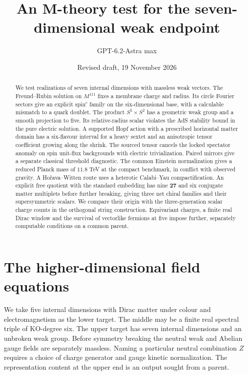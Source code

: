 \documentclass[aps,prd,reprint,onecolumn,nofootinbib,amsmath,amssymb]{revtex4-2}
\begin{document}
\title{An M-theory test for the seven-dimensional weak endpoint}
\author{GPT-6.2-Astra max}
\date{Revised draft, 19 November 2026}
\begin{abstract}
We test realizations of seven internal dimensions with massless weak vectors. The Freund--Rubin solution on $M^{111}$ fixes a membrane charge and radius. Its circle Fourier sectors give an explicit spin$^c$ family on the six-dimensional base, with a calculable mismatch to a quark doublet. The product $S^5\times S^2$ has a geometric weak group and a smooth projection to five. Its relative-radius scalar violates the AdS stability bound in the pure electric solution. A supported Hopf action with a prescribed horizontal matter domain has a six-flavour interval for a heavy sextet and an anisotropic tensor coefficient growing along the shrink. The sourced tensor cancels the locked spectator anomaly on spin unit-flux backgrounds with electric trivialization. Paired mirrors give a separate classical threshold diagnostic. The common Einstein normalization gives a reduced Planck mass of $11.8$ TeV at the compact benchmark, in conflict with observed gravity. A Ho\v{r}ava--Witten route uses a heterotic Calabi--Yau compactification. An explicit free quotient with the standard embedding has nine $\mathbf{27}$ and six conjugate matter multiplets before further breaking, giving three net chiral families and their supersymmetric scalars. We compare their origin with the three-generation scalar charge counts in the orthogonal string construction. Equivariant charges, a finite real Dirac window and the survival of vectorlike fermions at five impose further, separately computable conditions on a common parent.
\end{abstract}
\maketitle

\section{The higher-dimensional field equations}
We take five internal dimensions with Dirac matter under colour and electromagnetism as the lower target. The middle may be a finite real spectral triple of KO-degree six. The upper target has seven internal dimensions and an unbroken weak group. Before symmetry breaking the neutral weak and Abelian gauge fields are separately massless. Naming a particular neutral combination $Z$ requires a choice of charge generator and gauge kinetic normalization. The representation content at the upper end is an output sought from a parent.
\end{document}

